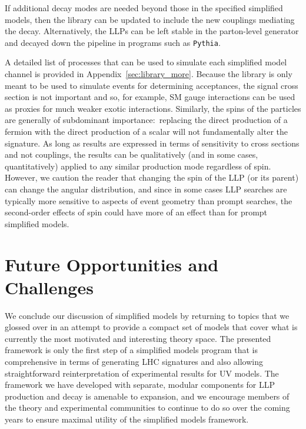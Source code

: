 %
If additional decay modes are needed beyond those in the specified simplified models, then the library can be updated to include the new couplings mediating the decay. Alternatively, the LLPs can be left stable in the parton-level generator and decayed down the pipeline in programs such as \texttt{Pythia}.

A detailed list of processes that can be used to simulate each simplified model channel is provided in Appendix~\ref{sec:library_more}. Because the library is only meant to be used to simulate events for determining acceptances, the signal cross section is not important and so, for example, SM gauge interactions can be used as proxies for much weaker exotic interactions. Similarly, the spins of the particles are generally of subdominant importance:~replacing the direct production of a fermion with the direct production of a scalar will not fundamentally alter the signature. As long as results are expressed in terms of sensitivity to cross sections and not couplings, the results can be qualitatively (and in some cases, quantitatively) applied to any similar production mode regardless of spin. However, we caution the reader that changing the spin of the LLP (or its parent) can change the angular distribution, and since in some cases LLP searches are typically more sensitive to aspects of event geometry than prompt searches, the second-order effects of spin could have more of an effect than for prompt simplified models.


\section{Future Opportunities and Challenges}\label{sec:simplified_future}

We conclude our discussion of simplified models by returning to topics that we glossed over in an attempt to provide a compact set of models that cover what is currently the most motivated and interesting theory space. The presented framework is only the first step of a simplified models program that is comprehensive in terms of generating LHC signatures and also allowing straightforward reinterpretation of experimental results for UV models. The framework we have developed with separate, modular components for LLP production and decay is amenable to expansion, and we encourage members of the theory and experimental communities to continue to do so over the coming years to ensure maximal utility of the simplified models framework.

